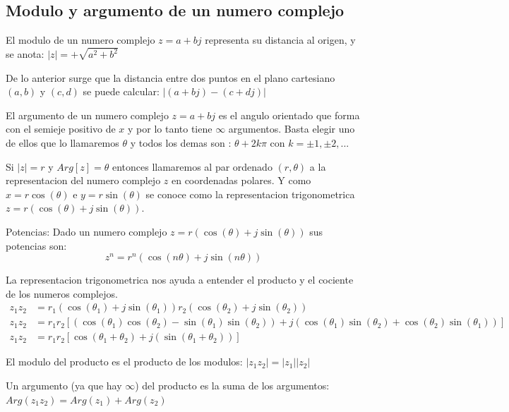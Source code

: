 \subsection{Modulo y argumento de un numero complejo}
\begin{defi}
   El modulo de un numero complejo $z=a+bj$ representa su distancia al origen, y se anota: $|z| = +\sqrt{a^{2}+b^{2}}$
\end{defi}
De lo anterior surge que la distancia entre dos puntos en el plano cartesiano $(a,b)$ y $(c,d)$ se puede calcular: $|(a+bj)-(c+dj)|$
\begin{defi}
   El argumento de un numero complejo $z=a+bj$ es el angulo orientado que forma con el semieje positivo de $x$ y por lo tanto tiene $\infty$ argumentos. Basta elegir uno de ellos que lo llamaremos $\theta$ y todos los demas son : $\theta+2k\pi$ con $k=\pm 1, \pm 2, ...$
\end{defi}
Si $|z|=r$ y $Arg[z]=\theta$ entonces llamaremos al par ordenado $(r, \theta)$ a la representacion del numero complejo $z$ en coordenadas polares. Y como $x=r\cos(\theta)$ e $y=r\sin(\theta)$ se conoce como la representacion trigonometrica $z=r(\cos(\theta)+ j\sin(\theta))$.

\begin{defi}{Potencias:}
   Dado un numero complejo $z=r(\cos(\theta)+j\sin(\theta))$ sus potencias son:
   \begin{equation}
      z^{n} = r^{n}(\cos(n\theta)+j\sin(n\theta))
   \end{equation}
\end{defi}


La representacion trigonometrica nos ayuda a entender el producto y el cociente de los numeros complejos.
\begin{align}
   z_{1}z_{2} &= r_{1}(\cos(\theta_{1})+j\sin(\theta_1))r_{2}(\cos(\theta_{2})+j\sin(\theta_{2}))\\
   z_{1}z_{2} &= r_{1}r_{2}[(\cos(\theta_1)\cos(\theta_2)-\sin(\theta_1)\sin(\theta_2))+j(\cos(\theta_1)\sin(\theta_2)+\cos(\theta_2)\sin(\theta_1))]\\
   z_{1}z_{2} &= r_{1}r_{2}[\cos(\theta_1 + \theta_2)+j(\sin(\theta_1 + \theta_2))]
\end{align}

\begin{defi}
   El modulo del producto es el producto de los modulos: $|z_1 z_2|=|z_1||z_2|$
\end{defi}

\begin{defi}
   Un argumento (ya que hay $\infty$) del producto es la suma de los argumentos: $Arg(z_1 z_2)=Arg(z_1)+Arg(z_2)$
\end{defi}

